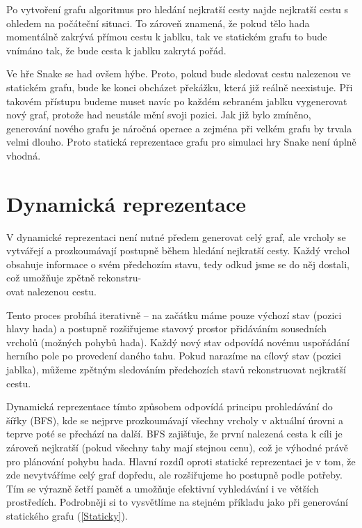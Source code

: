 Po vytvoření grafu algoritmus pro hledání nejkratší cesty najde nejkratší cestu s ohledem na počáteční situaci. To zároveň znamená, že pokud tělo hada momentálně zakrývá přímou cestu k jablku, tak ve statickém grafu to bude vnímáno tak, že bude cesta k jablku zakrytá pořád.

Ve hře Snake se had ovšem hýbe. Proto, pokud bude sledovat cestu nalezenou ve statickém grafu, bude ke konci obcházet překážku, která již reálně neexistuje. Při takovém přístupu budeme muset navíc po každém sebraném jablku vygenerovat nový graf, protože had neustále mění svoji pozici. Jak již bylo zmíněno, generování nového grafu je náročná operace a zejména při velkém grafu by trvala velmi dlouho. Proto statická reprezentace grafu pro simulaci hry Snake není úplně vhodná.

\section{Dynamická reprezentace}

V dynamické reprezentaci není nutné předem generovat celý graf, ale vrcholy se vytvářejí a prozkoumávají postupně během hledání nejkratší cesty. Každý vrchol obsahuje informace o svém předchozím stavu, tedy odkud jsme se do něj dostali, což umožňuje zpětně rekonstru-\\ ovat nalezenou cestu.

Tento proces probíhá iterativně – na začátku máme pouze výchozí stav (pozici hlavy hada) a postupně rozšiřujeme stavový prostor přidáváním sousedních vrcholů (možných pohybů hada). Každý nový stav odpovídá novému uspořádání herního pole po provedení daného tahu. Pokud narazíme na cílový stav (pozici jablka), můžeme zpětným sledováním předchozích stavů rekonstruovat nejkratší cestu.

Dynamická reprezentace tímto způsobem odpovídá principu prohledávání do šířky (BFS), kde se nejprve prozkoumávají všechny vrcholy v aktuální úrovni a teprve poté se přechází na další. BFS zajišťuje, že první nalezená cesta k cíli je zároveň nejkratší (pokud všechny tahy mají stejnou cenu), což je výhodné právě pro plánování pohybu hada. Hlavní rozdíl oproti statické reprezentaci je v tom, že zde nevytváříme celý graf dopředu, ale rozšiřujeme ho postupně podle potřeby. Tím se výrazně šetří paměť a umožňuje efektivní vyhledávání i ve větších prostředích. 
Podrobněji si to vysvětlíme na stejném příkladu jako při generování statického grafu (\ref{Staticky}).

